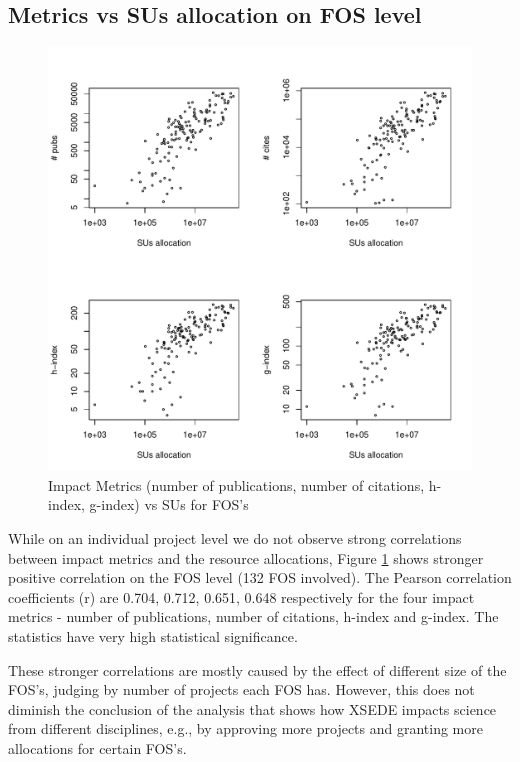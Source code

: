 \documentclass{sig-alternate}
\begin{document}
\subsection{Metrics vs SUs allocation on FOS level} 
 
\begin{figure}[!htb] 
  \centering 
    \includegraphics[width=1.0\columnwidth]{images/03_metrics_vs_alloc_fos.pdf} 
  \caption{Impact Metrics (number of publications, number of citations, h-index, g-index) vs SUs for FOS's}\label{F:metrics-vs-alloc-fos} 
\end{figure} 

While on an individual project level we do not observe strong correlations between impact metrics and the resource allocations, Figure \ref {F:metrics-vs-alloc-fos} shows stronger positive correlation on the FOS level (132 FOS involved). The Pearson correlation coefficients (r) are 0.704, 0.712, 0.651, 0.648 respectively for the four impact metrics - number of publications, number of citations, h-index and g-index. The statistics have very high statistical significance.  

These stronger correlations are mostly caused by the effect of different size of the FOS's, judging by number of projects each FOS has. However, this does not diminish the conclusion of the analysis that shows how XSEDE impacts science from different disciplines, e.g., by approving more projects and granting more allocations for certain FOS's. 
 
\end{document}
